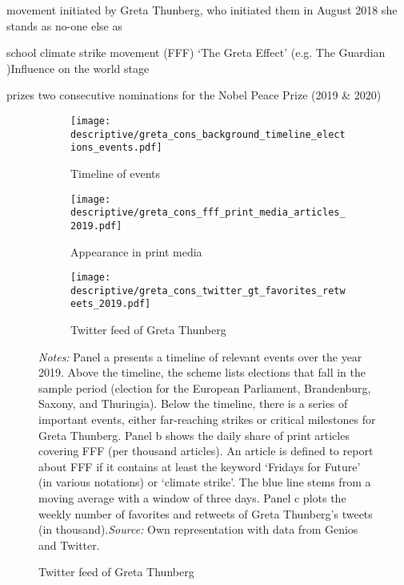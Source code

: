 movement initiated by Greta Thunberg, who initiated them in August 2018
she stands as no-one else as 

school climate strike movement (FFF)
`The Greta Effect' (e.g. The Guardian )Influence on the world stage

prizes 
two consecutive nominations for the Nobel Peace Prize (2019 \& 2020)







\newpage




\begin{landscape}
	\vspace*{\fill}
	\begin{figure}[H]\centering\caption{Important events surrounding FFF and perception in (social) media}

		
		
	
	
	
	
	\begin{subfigure}[h]{0.85\linewidth}\centering\caption{Timeline of events}
		\texttt{[image: descriptive/greta\_cons\_background\_timeline\_elections\_events.pdf]}
	\end{subfigure}
	
	
	\par\bigskip\smallskip %
		\begin{subfigure}[h]{0.43\linewidth}\centering\caption{Appearance in print media}
			\texttt{[image: descriptive/greta\_cons\_fff\_print\_media\_articles\_2019.pdf]}
		\end{subfigure}
		\begin{subfigure}[h]{0.43\linewidth}\centering\caption{Twitter feed of Greta Thunberg}
			\texttt{[image: descriptive/greta\_cons\_twitter\_gt\_favorites\_retweets\_2019.pdf]}
		\end{subfigure}
		
		\begin{minipage}{0.86\linewidth}
			\scriptsize{\emph{Notes:} Panel a presents a timeline of relevant events over the year 2019. Above the timeline, the scheme lists elections that fall in the sample period (election for the European Parliament, Brandenburg, Saxony, and Thuringia). Below the timeline, there is a series of important events, either far-reaching strikes or critical milestones for Greta Thunberg. Panel b shows the daily share of print articles covering FFF (per thousand articles). An article is defined to report about FFF if it contains at least the keyword `Fridays for Future' (in various notations) or `climate strike'. The blue line stems from a moving average with a window of three days. Panel c plots the weekly number of favorites and retweets of Greta Thunberg's tweets (in thousand).\newline \emph{Source:} Own representation with data from Genios and Twitter.}
		\end{minipage}
	\end{figure}
	\vspace*{\fill}\clearpage
\end{landscape}
